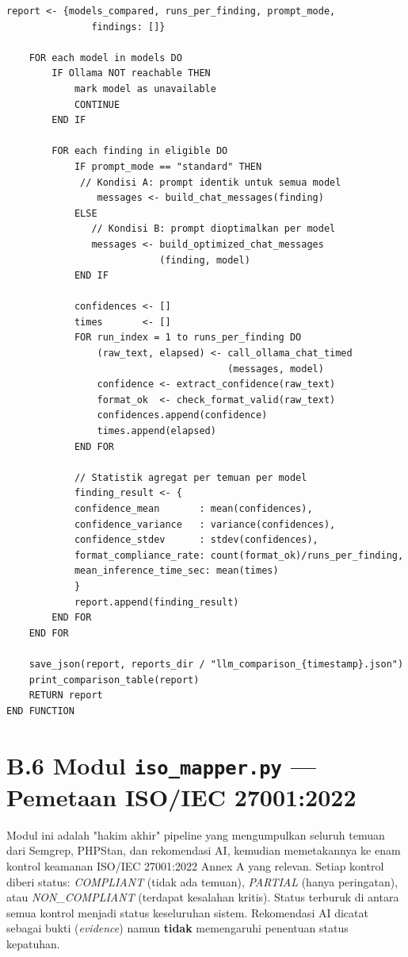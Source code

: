 \begin{lstlisting}[style=pseudocodestyle]
    report <- {models_compared, runs_per_finding, prompt_mode, 
               findings: []}

    FOR each model in models DO
        IF Ollama NOT reachable THEN
            mark model as unavailable
            CONTINUE
        END IF

        FOR each finding in eligible DO
            IF prompt_mode == "standard" THEN
             // Kondisi A: prompt identik untuk semua model
                messages <- build_chat_messages(finding)
            ELSE
               // Kondisi B: prompt dioptimalkan per model
               messages <- build_optimized_chat_messages
                           (finding, model)
            END IF

            confidences <- []
            times       <- []
            FOR run_index = 1 to runs_per_finding DO
                (raw_text, elapsed) <- call_ollama_chat_timed
                                       (messages, model)
                confidence <- extract_confidence(raw_text)
                format_ok  <- check_format_valid(raw_text)
                confidences.append(confidence)
                times.append(elapsed)
            END FOR

            // Statistik agregat per temuan per model
            finding_result <- {
            confidence_mean       : mean(confidences),
            confidence_variance   : variance(confidences),
            confidence_stdev      : stdev(confidences),
            format_compliance_rate: count(format_ok)/runs_per_finding,
            mean_inference_time_sec: mean(times)
            }
            report.append(finding_result)
        END FOR
    END FOR

    save_json(report, reports_dir / "llm_comparison_{timestamp}.json")
    print_comparison_table(report)
    RETURN report
END FUNCTION
\end{lstlisting}

\section*{B.6 Modul \texttt{iso\_mapper.py} --- Pemetaan ISO/IEC 27001:2022}

Modul ini adalah "hakim akhir" pipeline yang mengumpulkan seluruh temuan dari
Semgrep, PHPStan, dan rekomendasi AI, kemudian memetakannya ke enam kontrol
keamanan ISO/IEC 27001:2022 Annex A yang relevan. Setiap kontrol diberi status:
\textit{COMPLIANT} (tidak ada temuan), \textit{PARTIAL} (hanya peringatan), atau
\textit{NON\_COMPLIANT} (terdapat kesalahan kritis). Status terburuk di antara
semua kontrol menjadi status keseluruhan sistem. Rekomendasi AI dicatat sebagai
bukti (\textit{evidence}) namun \textbf{tidak} memengaruhi penentuan status
kepatuhan.

